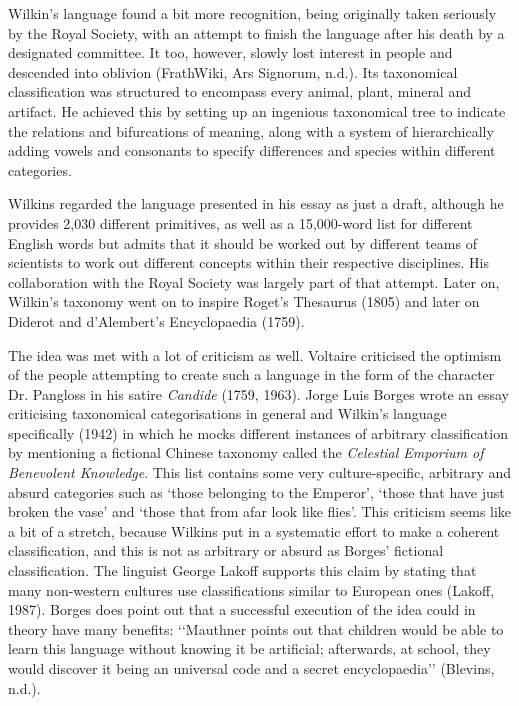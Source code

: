 Wilkin’s language found a bit more recognition, being originally taken seriously by the Royal Society, with an attempt to finish the language after his death by a designated committee. It too, however, slowly lost interest in people and descended into oblivion  (FrathWiki, Ars Signorum, n.d.). Its taxonomical classification was structured to encompass every animal, plant, mineral and artifact. He achieved this by setting up an ingenious taxonomical tree to indicate the relations and bifurcations of meaning, along with a system of hierarchically adding vowels and consonants to specify differences and species within different categories. 

Wilkins regarded the language presented in his essay as just a draft, although he provides 2,030 different primitives, as well as a 15,000-word list for different English words but admits that it should be worked out by different teams of scientists to work out different concepts within their respective disciplines. His collaboration with the Royal Society was largely part of that attempt. Later on, Wilkin’s taxonomy went on to inspire Roget’s Thesaurus (1805) and later on Diderot and d’Alembert’s Encyclopaedia (1759).  

The idea was met with a lot of criticism as well. Voltaire criticised the optimism of the people attempting to create such a language in the form of the character Dr. Pangloss in his satire \textit{Candide} (1759, 1963). Jorge Luis Borges wrote an essay criticising taxonomical categorisations in general and Wilkin’s language specifically (1942) in which he mocks different instances of arbitrary classification by mentioning a fictional Chinese taxonomy called the \textit{Celestial Emporium of Benevolent Knowledge}. This list contains some very culture-specific, arbitrary and absurd categories such as ‘those belonging to the Emperor’, ‘those that have just broken the vase’ and ‘those that from afar look like flies’. This criticism seems like a bit of a stretch, because Wilkins put in a systematic effort to make a coherent classification, and this is not as arbitrary or absurd as Borges’ fictional classification. The linguist George Lakoff supports this claim by stating that many non-western cultures use classifications similar to European ones (Lakoff, 1987). Borges does point out that a successful execution of the idea could in theory have many benefits: ‘‘Mauthner points out that children would be able to learn this language without knowing it be artificial; afterwards, at school, they would discover it being an universal code and a secret encyclopaedia’’ (Blevins, n.d.). 

